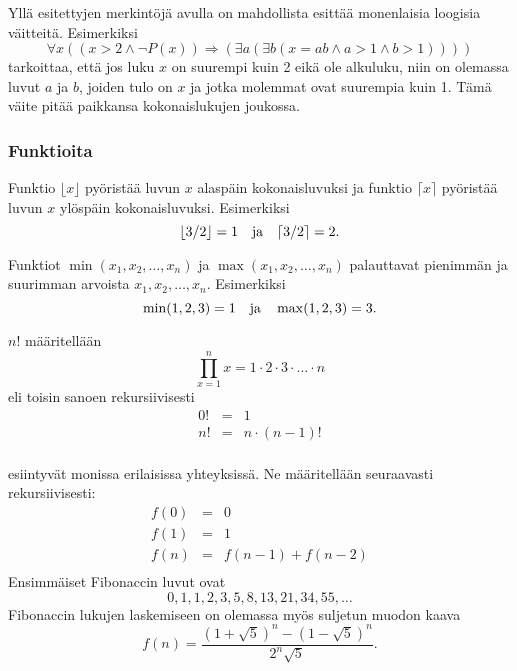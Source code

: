 Yllä esitettyjen merkintöjä avulla on mahdollista esittää
monenlaisia loogisia väitteitä.
Esimerkiksi
\[\forall x ((x>2 \land \lnot P(x)) \Rightarrow (\exists a (\exists b (x = ab \land a > 1 \land b > 1))))\]
tarkoittaa, että jos luku $x$ on suurempi
kuin 2 eikä ole alkuluku,
niin on olemassa luvut $a$ ja $b$,
joiden tulo on $x$ ja jotka molemmat ovat suurempia kuin 1.
Tämä väite pitää paikkansa kokonaislukujen joukossa.

\subsubsection{Funktioita}

Funktio $\lfloor x \rfloor$ pyöristää luvun $x$
alaspäin kokonaisluvuksi ja
funktio $\lceil x \rceil$ pyöristää luvun $x$
ylöspäin kokonaisluvuksi. Esimerkiksi
\[ \lfloor 3/2 \rfloor = 1 \hspace{10px} \textrm{ja} \hspace{10px} \lceil 3/2 \rceil = 2.\]

Funktiot $\min(x_1,x_2,\ldots,x_n)$
ja $\max(x_1,x_2,\ldots,x_n)$
palauttavat pienimmän ja suurimman
arvoista $x_1,x_2,\ldots,x_n$.
Esimerkiksi
\[ \min(1,2,3)=1 \hspace{10px} \textrm{ja} \hspace{10px} \max(1,2,3)=3.\]


 $n!$ määritellään
\[\prod_{x=1}^n x = 1 \cdot 2 \cdot 3 \cdot \ldots \cdot n\]
eli toisin sanoen rekursiivisesti
\[
\begin{array}{lcl}
0! & = & 1 \\
n! & = & n \cdot (n-1)! \\
\end{array}
\]


 esiintyvät monissa erilaisissa yhteyksissä.
Ne määritellään seuraavasti rekursiivisesti:
\[
\begin{array}{lcl}
f(0) & = & 0 \\
f(1) & = & 1 \\
f(n) & = & f(n-1)+f(n-2) \\
\end{array}
\]
Ensimmäiset Fibonaccin luvut ovat
\[0, 1, 1, 2, 3, 5, 8, 13, 21, 34, 55, \ldots\]
Fibonaccin lukujen laskemiseen on olemassa myös
suljetun muodon kaava
\[f(n)=\frac{(1 + \sqrt{5})^n - (1-\sqrt{5})^n}{2^n \sqrt{5}}.\]

